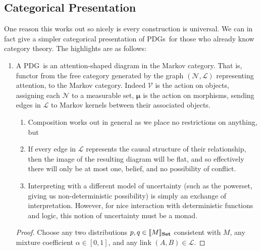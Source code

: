 \documentclass{article}
\newcommand\Set{\textbf{Set}}
\newcommand\bmu{\boldsymbol{\mu}}
\newcommand{\MN}{PDG}
\newcommand{\MNs}{\MN s}
\begin{document}
	\begin{vcat}
		\section{Categorical Presentation}
		One reason this works out so nicely is every construction is universal. We can in fact give a simpler categorical presentation of \MNs\ for those who already know category theory. The highlights are as follows:
		\begin{enumerate}
			\item A \MN\ is an attention-shaped diagram in the Markov category. That is, functor from the free category generated by the graph $(\mathcal N, \mathcal L)$ representing attention, to the Markov category. Indeed $\mathcal V$ is the action on objects, assigning each $\mathcal N$ to a measurable set, $\bmu$ is the action on morphisms, sending edges in $\mathcal L$ to Markov kernels between their associated objects. 
			\begin{enumerate}
				\item Composition works out in general as we place no restrictions on anything, but
				\item If every edge in $\mathcal L$ represents the causal structure of their relationship, then the image of the resulting diagram will be flat, and so effectively there will only be at most one, belief, and no possibility of conflict.
				\item Interpreting with a different model of uncertainty (such as the powerset, giving us non-deterministic possibility) is simply an exchange of interpretation. However, for nice interaction with deterministic functions and logic, this notion of uncertainty must be a monad.
			\end{enumerate}	\begin{proof}
			Choose any two distributions $p, q \in \bbr{M}_\Set$ consistent with $M$, any mixture coefficient $\alpha \in [0,1]$, and any link $(A,B) \in \mathcal L$.
			

\end{proof}
\end{enumerate}
\end{vcat}
\end{document}
